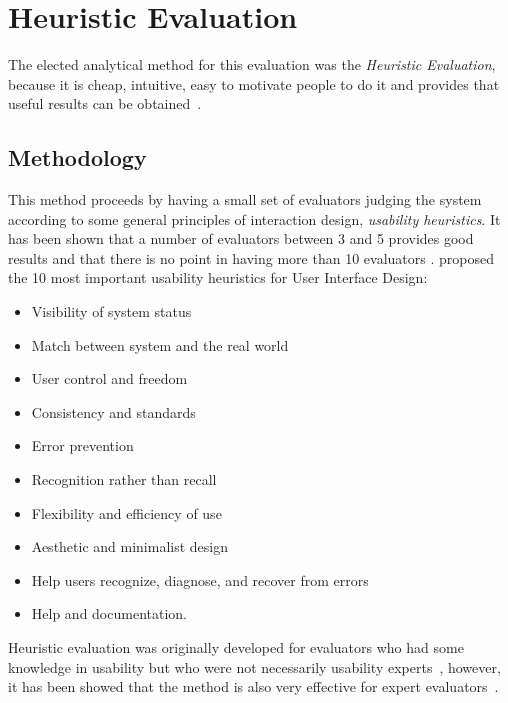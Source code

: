 \documentclass[a4paper]{article}
\begin{document}
\section{Heuristic Evaluation}

The elected analytical method for this evaluation was the \emph{Heuristic Evaluation}, because it is cheap, intuitive, easy to motivate people to do it and provides that useful results can be obtained~\citep{nielsen1990heuristic}.

\subsection{Methodology}
This method proceeds by having a small set of evaluators judging the system according to some general principles of interaction design, \emph{usability heuristics}. It has been shown that a number of evaluators between 3 and 5 provides good results and that there is no point in having more than 10 evaluators \citep{nielsen1990heuristic}. \citet{nielsen1995ten} proposed the 10 most important usability heuristics for User Interface Design:

\begin{itemize}
	\item Visibility of system status

	\item Match between system and the real world

	\item User control and freedom

	\item Consistency and standards

	\item Error prevention

	\item Recognition rather than recall

	\item Flexibility and efficiency of use

	\item Aesthetic and minimalist design

	\item Help users recognize, diagnose, and recover from errors

	\item Help and documentation.
\end{itemize}

Heuristic evaluation was originally developed for evaluators who had some knowledge in usability but who were not necessarily usability experts~\citep{nielsen1990heuristic}, however, it has been showed that the method is also very effective for expert evaluators~\citep{nielsen1992finding}.
\end{document}
